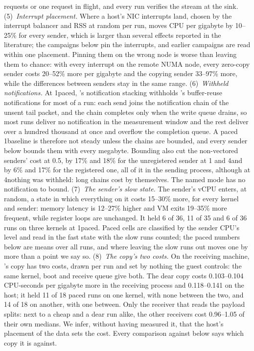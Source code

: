 requests or one request in flight, and every run verifies the stream at the sink.
(5)~\emph{Interrupt placement.} Where a host's NIC interrupts land, chosen by the interrupt
balancer and RSS at random per run, moves CPU per gigabyte by 10--25\% for every sender, which
is larger than several effects reported in the literature; the campaigns below pin the
interrupts, and earlier campaigns are read within one placement. Pinning them on the wrong node
is worse than leaving them to chance: with every interrupt on the remote NUMA node, every
zero-copy sender costs 20--52\% more per gigabyte and the copying sender 33--97\% more, while
the differences between senders stay in the same range. %
(6)~\emph{Withheld notifications.} At 1\KiB paced, \iouring's notification stacking withholds
\sendzc's buffer-reuse notifications for most of a run: each send joins the notification chain
of the unsent tail packet, and the chain completes only when the write queue drains, so most
runs deliver no notification in the measurement window and the rest deliver over a hundred
thousand at once and overflow the completion queue. A paced 1\KiB \sendzc baseline is therefore
not steady unless the chains are bounded, and every \sendzc sender below bounds them with
 every megabyte. Bounding also cut the non-vectored \sendzc senders' cost at
0.5\GBs, by 17\% and 18\% for the unregistered sender at 1 and 4\KiB and by 6\% and 17\% for
the registered one, all of it in the sending process, although at 4\KiB nothing was withheld:
long chains cost by themselves. The named mode has no notification to bound.
(7)~\emph{The sender's slow state.} The sender's vCPU enters, at random, a state in which
everything on it costs 15--30\% more, for every kernel and sender: memory latency is 12--27\%
higher and VM exits 19--35\% more frequent, while register loops are unchanged. It held 6 of
36, 11 of 35 and 6 of 36 runs on three kernels at 1\KiB paced. Paced cells are classified by
the sender CPU's level and read in the fast state with the slow runs counted; the paced numbers
below are means over all runs, and where leaving the slow runs out moves one by more than a
point we say so. %
(8)~\emph{The copy's two costs.} On the receiving machine, 's copy has two costs,
drawn per run and set by nothing the guest controls: the same kernel, boot and receive queue
give both. The dear copy costs 0.103--0.104 CPU-seconds per gigabyte more in the receiving
process and 0.118--0.141 on the host; it held 11 of 18 paced runs on one kernel, with none
between the two, and 14 of 18 on another, with one between. Only the receiver that reads the
payload splits: next to a cheap and a dear  run alike, the other receivers cost
0.96--1.05 of their own medians. We infer, without having measured it, that the host's
placement of the data sets the cost. Every comparison against  below says which
copy it is against. %

